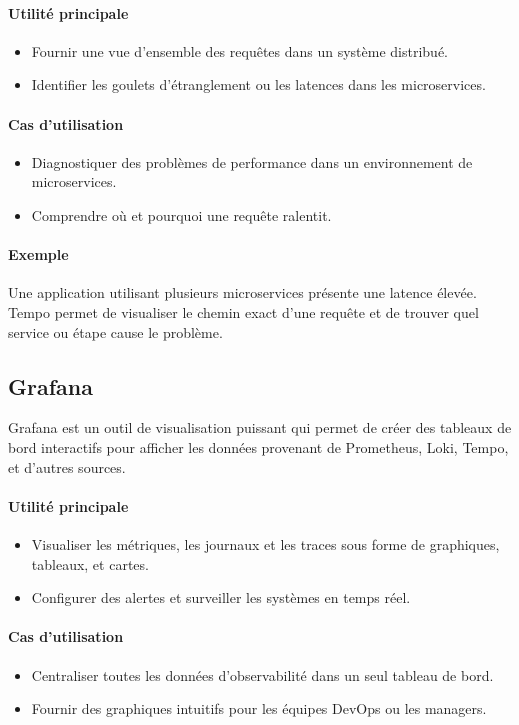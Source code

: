 \documentclass[french, 12pt]{article}%
\newcommand{\itemE}{\item[$\bullet$]}
\begin{document}
\paragraph{Utilité principale}
\begin{itemize}
    \itemE Fournir une vue d'ensemble des requêtes dans un système distribué.
    \itemE Identifier les goulets d'étranglement ou les latences dans les microservices.
\end{itemize}

\paragraph{Cas d'utilisation}
\begin{itemize}
    \itemE Diagnostiquer des problèmes de performance dans un environnement de microservices.
    \itemE Comprendre où et pourquoi une requête ralentit.
\end{itemize}

\paragraph{Exemple}
Une application utilisant plusieurs microservices présente une latence élevée. Tempo permet de visualiser le chemin exact d'une requête et de trouver quel service ou étape cause le problème.

\subsection{Grafana}
Grafana est un outil de visualisation puissant qui permet de créer des tableaux de bord interactifs pour afficher les données provenant de Prometheus, Loki, Tempo, et d'autres sources.

\paragraph{Utilité principale}
\begin{itemize}
    \itemE Visualiser les métriques, les journaux et les traces sous forme de graphiques, tableaux, et cartes.
    \itemE Configurer des alertes et surveiller les systèmes en temps réel.
\end{itemize}

\paragraph{Cas d'utilisation}
\begin{itemize}
    \itemE Centraliser toutes les données d'observabilité dans un seul tableau de bord.
    \itemE Fournir des graphiques intuitifs pour les équipes DevOps ou les managers.
\end{itemize}
\end{document}

